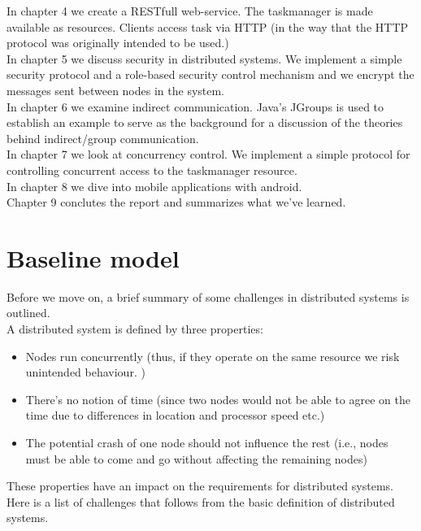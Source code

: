 In chapter 4 we create a RESTfull web-service. The taskmanager is made available as resources. 
Clients access task via HTTP (in the way that the HTTP protocol was originally intended to be used.) \\

In chapter 5 we discuss security in distributed systems. We implement a simple security protocol and a role-based security control mechanism and we encrypt the messages sent between nodes in the system. \\

In chapter 6 we examine indirect communication. Java's JGroups is used to establish an example to serve as the background for a discussion of the theories behind indirect/group communication. \\

In chapter 7 we look at concurrency control. We implement a simple protocol for controlling concurrent access to the taskmanager resource.\\

In chapter 8 we dive into mobile applications with android. \\

Chapter 9 conclutes the report and summarizes what we've learned.


\section{Baseline model}

Before we move on, a brief summary of some challenges in distributed systems is outlined.\\

A distributed system is defined by three properties:
\begin{itemize}

\item Nodes run concurrently (thus, if they operate on the same resource we risk unintended behaviour. )
\item There's no notion of time (since two nodes would not be able to agree on the time due to differences in location and processor speed etc.) 
\item The potential crash of one node should not influence the rest (i.e., nodes must be able to come and go without affecting the remaining nodes)
\end{itemize}

These properties have an impact on the requirements for distributed systems. Here is a list of challenges that follows from the basic definition of distributed systems.

